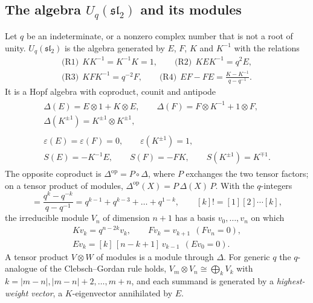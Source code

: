 \documentclass{SciPost}
\newcommand{\Uq}{U_q(\mathfrak{sl}_2)}
\begin{document}
\subsection{The algebra \texorpdfstring{$\Uq$}{Uq(sl2)} and its modules}
\label{sec:uq}

Let $q$ be an indeterminate, or a nonzero complex number that is not a root of unity. $\Uq$ is the algebra generated by $E$, $F$, $K$ and $K^{-1}$ with the relations
\begin{equation}
\begin{gathered}
\text{(R1)}\ \ KK^{-1}=K^{-1}K=1,\qquad
\text{(R2)}\ \ KEK^{-1}=q^{2}E,\\
\text{(R3)}\ \ KFK^{-1}=q^{-2}F,\qquad
\text{(R4)}\ \ EF-FE=\frac{K-K^{-1}}{q-q^{-1}} .
\end{gathered}
\label{eq:relations}
\end{equation}
It is a Hopf algebra with coproduct, counit and antipode
\begin{gather}
\begin{gathered}
\Delta(E)=E\otimes 1+K\otimes E,\qquad \Delta(F)=F\otimes K^{-1}+1\otimes F,\\
\Delta(K^{\pm1})=K^{\pm1}\otimes K^{\pm1},
\end{gathered}
\label{eq:coproduct}\\
\begin{gathered}
\varepsilon(E)=\varepsilon(F)=0,\qquad \varepsilon(K^{\pm1})=1,\\
S(E)=-K^{-1}E,\qquad S(F)=-FK,\qquad S(K^{\pm1})=K^{\mp1}.
\end{gathered}
\label{eq:hopf}
\end{gather}
The opposite coproduct is $\Delta^{\mathrm{op}}=P\circ\Delta$, where $P$ exchanges the two tensor factors; on a tensor product of modules, $\Delta^{\mathrm{op}}(X)=P\,\Delta(X)\,P$. With the $q$-integers
\begin{equation}
[k]=\frac{q^{k}-q^{-k}}{q-q^{-1}}=q^{k-1}+q^{k-3}+\dots+q^{1-k},\qquad [k]!=[1][2]\cdots[k],
\end{equation}
the irreducible module $V_n$ of dimension $n+1$ has a basis $v_0,\dots,v_n$ on which
\begin{equation}
\begin{gathered}
K v_k=q^{n-2k}v_k,\qquad F v_k=v_{k+1}\ \ (F v_n=0),\\
E v_k=[k]\,[n-k+1]\,v_{k-1}\ \ (E v_0=0).
\end{gathered}
\label{eq:module}
\end{equation}
A tensor product $V\otimes W$ of modules is a module through $\Delta$. For generic $q$ the $q$-analogue of the Clebsch--Gordan rule holds, $V_m\otimes V_n\cong\bigoplus_{k}V_k$ with $k=|m-n|,|m-n|+2,\dots,m+n$, and each summand is generated by a \emph{highest-weight vector}, a $K$-eigenvector annihilated by $E$.
\end{document}

